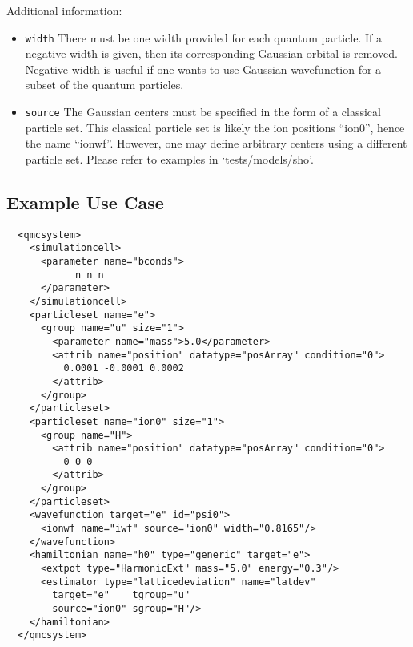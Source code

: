 \FloatBarrier

Additional information:
\begin{itemize}
\item \texttt{width} There must be one width provided for each quantum particle. If a negative width is given, then its corresponding Gaussian orbital is removed. Negative width is useful if one wants to use Gaussian wavefunction for a subset of the quantum particles.
\item \texttt{source} The Gaussian centers must be specified in the form of a classical particle set. This classical particle set is likely the ion positions ``ion0'', hence the name ``ionwf''. However, one may define arbitrary centers using a different particle set. Please refer to examples in `tests/models/sho'.
\end{itemize}

\subsection{Example Use Case}
\begin{lstlisting}
  <qmcsystem>
    <simulationcell>
      <parameter name="bconds">
            n n n
      </parameter>
    </simulationcell>
    <particleset name="e">
      <group name="u" size="1">
        <parameter name="mass">5.0</parameter>
        <attrib name="position" datatype="posArray" condition="0">
          0.0001 -0.0001 0.0002
        </attrib>
      </group>
    </particleset>
    <particleset name="ion0" size="1">
      <group name="H">
        <attrib name="position" datatype="posArray" condition="0">
          0 0 0
        </attrib>
      </group>
    </particleset>
    <wavefunction target="e" id="psi0">
      <ionwf name="iwf" source="ion0" width="0.8165"/>
    </wavefunction>
    <hamiltonian name="h0" type="generic" target="e">
      <extpot type="HarmonicExt" mass="5.0" energy="0.3"/>
      <estimator type="latticedeviation" name="latdev" 
        target="e"    tgroup="u" 
        source="ion0" sgroup="H"/>
    </hamiltonian>
  </qmcsystem>
\end{lstlisting}

